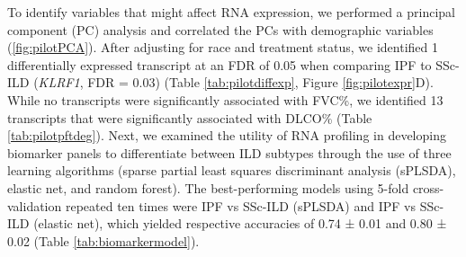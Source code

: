 \documentclass[
]{article}
\begin{document}
To identify variables that might affect RNA expression, we performed a principal component (PC) analysis and correlated the PCs with demographic variables (\ref{fig:pilotPCA}). After adjusting for race and treatment status, we identified 1 differentially expressed transcript at an FDR of 0.05 when comparing IPF to SSc-ILD (\textit{KLRF1}, FDR = 0.03) (Table \ref{tab:pilotdiffexp}, Figure \ref{fig:pilotexpr}D). While no transcripts were significantly associated with FVC\%, we identified 13 transcripts that were significantly associated with DLCO\% (Table \ref{tab:pilotpftdeg}). Next, we examined the utility of RNA profiling in developing biomarker panels to differentiate between ILD subtypes through the use of three learning algorithms (sparse partial least squares discriminant analysis (sPLSDA), elastic net, and random forest). The best-performing models using 5-fold cross-validation repeated ten times were IPF vs SSc-ILD (sPLSDA) and IPF vs SSc-ILD (elastic net), which yielded respective accuracies of 0.74 ± 0.01 and 0.80 ± 0.02 (Table \ref{tab:biomarkermodel}).

\newpage

\captionsetup{width=6.5in}
\end{document}
